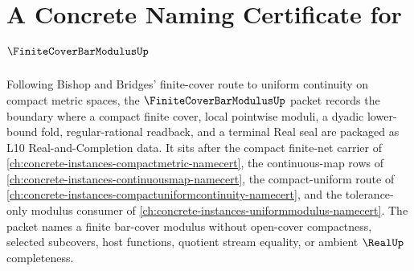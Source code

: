 \chapter{A Concrete Naming Certificate for $\FiniteCoverBarModulusUp$}
\label{ch:concrete-instances-finite-cover-bar-modulus-namecert}

Following Bishop and Bridges' finite-cover route to uniform continuity on compact metric spaces, the $\FiniteCoverBarModulusUp$ packet records the boundary where a compact finite cover, local pointwise moduli, a dyadic lower-bound fold, regular-rational readback, and a terminal Real seal are packaged as L10 Real-and-Completion data. It sits after the compact finite-net carrier of \autoref{ch:concrete-instances-compactmetric-namecert}, the continuous-map rows of \autoref{ch:concrete-instances-continuousmap-namecert}, the compact-uniform route of \autoref{ch:concrete-instances-compactuniformcontinuity-namecert}, and the tolerance-only modulus consumer of \autoref{ch:concrete-instances-uniformmodulus-namecert}. The packet names a finite bar-cover modulus without open-cover compactness, selected subcovers, host functions, quotient stream equality, or ambient $\RealUp$ completeness.

